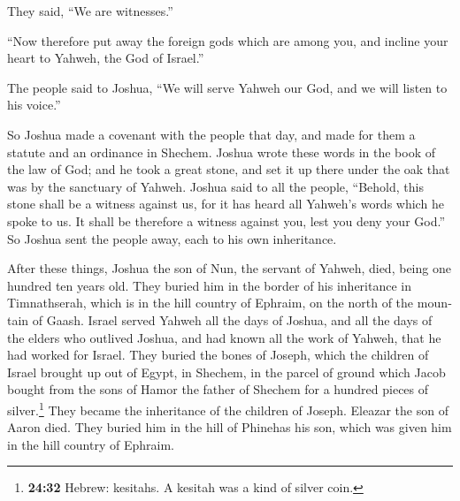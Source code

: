 \begin{paracol}{2}
\begin{otherlanguage}{english}
They said, ``We are witnesses.''

 ``Now therefore put away the foreign gods which are
among you, and incline your heart to Yahweh, the God of Israel.''

 The people said to Joshua, ``We will serve Yahweh our
God, and we will listen to his voice.''

 So Joshua made a covenant with the people that day, and
made for them a statute and an ordinance in Shechem. 
Joshua wrote these words in the book of the law of God; and he took a
great stone, and set it up there under the oak that was by the sanctuary
of Yahweh.  Joshua said to all the people, ``Behold, this
stone shall be a witness against us, for it has heard all Yahweh's words
which he spoke to us. It shall be therefore a witness against you, lest
you deny your God.''  So Joshua sent the people away,
each to his own inheritance.

 After these things, Joshua the son of Nun, the servant
of Yahweh, died, being one hundred ten years old.  They
buried him in the border of his inheritance in Timnathserah, which is in
the hill country of Ephraim, on the north of the mountain of Gaash.
 Israel served Yahweh all the days of Joshua, and all the
days of the elders who outlived Joshua, and had known all the work of
Yahweh, that he had worked for Israel.  They buried the
bones of Joseph, which the children of Israel brought up out of Egypt,
in Shechem, in the parcel of ground which Jacob bought from the sons of
Hamor the father of Shechem for a hundred pieces of silver.\footnote{\textbf{24:32}
  Hebrew: kesitahs. A kesitah was a kind of silver coin.} They became
the inheritance of the children of Joseph.  Eleazar the
son of Aaron died. They buried him in the hill of Phinehas his son,
which was given him in the hill country of Ephraim.
\end{otherlanguage} \end{paracol}

